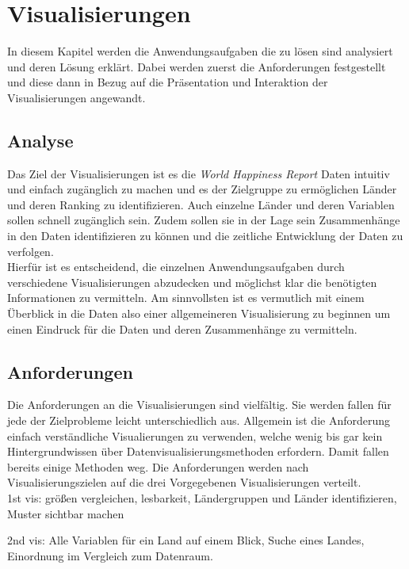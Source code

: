 \section{Visualisierungen}
In diesem Kapitel werden die Anwendungsaufgaben die zu lösen sind analysiert und deren Lösung erklärt. Dabei werden zuerst die Anforderungen festgestellt und diese dann in Bezug auf die Präsentation und Interaktion der Visualisierungen angewandt.  

\subsection{Analyse}

Das Ziel der Visualisierungen ist es die \textit{World Happiness Report} Daten intuitiv und einfach zugänglich zu machen und es der Zielgruppe zu ermöglichen Länder und deren Ranking zu identifizieren. Auch einzelne Länder und deren Variablen sollen schnell zugänglich sein. Zudem sollen sie in der Lage sein Zusammenhänge in den Daten identifizieren zu können und die zeitliche Entwicklung der Daten zu verfolgen. \\

Hierfür ist es entscheidend, die einzelnen Anwendungsaufgaben durch verschiedene Visualisierungen abzudecken und möglichst klar die benötigten Informationen zu vermitteln. 
Am sinnvollsten ist es vermutlich mit einem Überblick in die Daten also einer allgemeineren Visualisierung zu beginnen um einen Eindruck für die Daten und deren Zusammenhänge zu vermitteln. \\

\subsection{Anforderungen}
Die Anforderungen an die Visualisierungen sind vielfältig. Sie werden fallen für jede der Zielprobleme leicht unterschiedlich aus. Allgemein ist die Anforderung einfach verständliche Visualierungen zu verwenden, welche wenig bis gar kein Hintergrundwissen über Datenvisualisierungsmethoden erfordern. Damit fallen bereits einige Methoden weg. Die Anforderungen werden nach Visualisierungszielen auf die drei Vorgegebenen Visualisierungen verteilt.\\

1st vis: größen vergleichen, lesbarkeit, Ländergruppen und Länder identifizieren, Muster sichtbar machen

2nd vis: Alle Variablen für ein Land auf einem Blick, Suche eines Landes, Einordnung im Vergleich zum Datenraum. 

